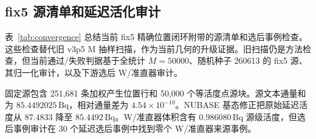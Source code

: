 \documentclass[preprint,12pt]{elsarticle}
\newcommand{\wii}{W_{511}}
\begin{document}
\begin{table}[t]
\centering
\caption{当前 fix5 精确位置链路中选后 $\wii$ 本底组成。除特别说明外，百分比相对于总 $\wii$ 本底。}
\label{tab:bgcomp}
\footnotesize
{}
\end{table}

\subsection{fix5 源清单和延迟活化审计}
\label{subsec:convergence}

表~\ref{tab:convergence} 总结当前 fix5 精确位置闭环附带的源清单和选后事例检查。这些检查替代旧 v3p5 M 抽样扫描，作为当前几何的升级证据。旧扫描仍是方法检查，但当前通过/失败判据基于全统计 $M=50000$、随机种子 260613 的 fix5 源、其归一化审计，以及下游选后 W/准直器审计。

固定源包含 251,681 条加权产生位置行和 50,000 个等活度点源块。源文本通量和为 $85.4492025\,\mathrm{Bq}$，相对通量差为 $4.54\times10^{-10}$。NUBASE 基态修正把原始延迟活度从 $87.4833$ 降至 $85.4492\,\mathrm{Bq}$。W/准直器体积含有 $0.986080\,\mathrm{Bq}$ 源级活度，但选后事例审计在 30 个延迟选后事例中找到零个 W/准直器来源事例。

\begin{table}[t]
\centering
\caption{当前 fix5 延迟源清单和选后事例审计。}
\label{tab:convergence}
\end{table}
\end{document}
